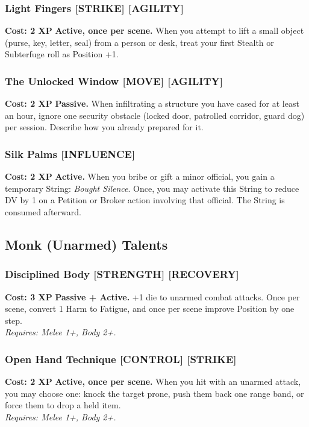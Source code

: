 \subsubsection*{Light Fingers \textnormal{[STRIKE] [AGILITY]}}
\label{talent:light-fingers}
\textbf{Cost: 2 XP} \textbf{Active, once per scene.} When you attempt to lift a small object (purse, key, letter, seal) from a person or desk, treat your first Stealth or Subterfuge roll as Position +1.

\subsubsection*{The Unlocked Window \textnormal{[MOVE] [AGILITY]}}
\label{talent:unlocked-window}
\textbf{Cost: 2 XP} \textbf{Passive.} When infiltrating a structure you have cased for at least an hour, ignore one security obstacle (locked door, patrolled corridor, guard dog) per session. Describe how you already prepared for it.

\subsubsection*{Silk Palms \textnormal{[INFLUENCE]}}
\label{talent:silk-palms}
\textbf{Cost: 2 XP} \textbf{Active.} When you bribe or gift a minor official, you gain a temporary String: \textit{Bought Silence}. Once, you may activate this String to reduce DV by 1 on a Petition or Broker action involving that official. The String is consumed afterward.

\subsection*{Monk (Unarmed) Talents}
\label{sec:minor-monk}

\subsubsection*{Disciplined Body \textnormal{[STRENGTH] [RECOVERY]}}
\label{talent:disciplined-body}
\textbf{Cost: 3 XP} \textbf{Passive + Active.} +1 die to unarmed combat attacks. Once per scene, convert 1 Harm to Fatigue, and once per scene improve Position by one step. \\
\textit{Requires: Melee 1+, Body 2+.}

\subsubsection*{Open Hand Technique \textnormal{[CONTROL] [STRIKE]}}
\label{talent:open-hand-technique}
\textbf{Cost: 2 XP} \textbf{Active, once per scene.} When you hit with an unarmed attack, you may choose one: knock the target prone, push them back one range band, or force them to drop a held item. \\
\textit{Requires: Melee 1+, Body 2+.}

